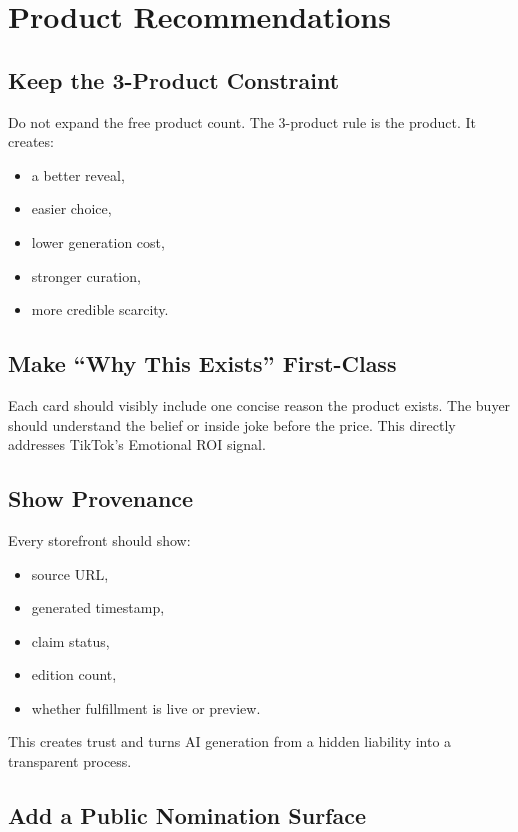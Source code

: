 \documentclass[11pt]{article}
\begin{document}
\section{Product Recommendations}

\subsection{Keep the 3-Product Constraint}

Do not expand the free product count. The 3-product rule is the product. It creates:

\begin{itemize}
  \item a better reveal,
  \item easier choice,
  \item lower generation cost,
  \item stronger curation,
  \item more credible scarcity.
\end{itemize}

\subsection{Make ``Why This Exists'' First-Class}

Each card should visibly include one concise reason the product exists. The buyer should understand the belief or inside joke before the price. This directly addresses TikTok's Emotional ROI signal.

\subsection{Show Provenance}

Every storefront should show:

\begin{itemize}
  \item source URL,
  \item generated timestamp,
  \item claim status,
  \item edition count,
  \item whether fulfillment is live or preview.
\end{itemize}

This creates trust and turns AI generation from a hidden liability into a transparent process.

\subsection{Add a Public Nomination Surface}
\end{document}
